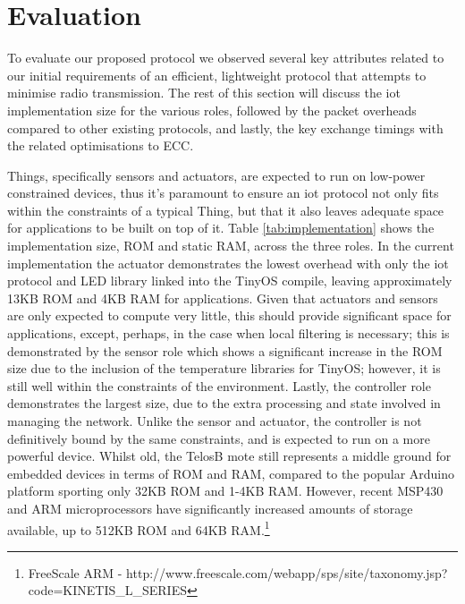 \documentclass[conference]{./sty/IEEEtran}
\begin{document}
\section{Evaluation} %
\label{sec:evaluation}
To evaluate our proposed protocol we observed several key attributes related to our initial requirements of an efficient, lightweight protocol that attempts to minimise radio transmission. The rest of this section will discuss the iot implementation size for the various roles, followed by the packet overheads compared to other existing protocols, and lastly, the key exchange timings with the related optimisations to ECC.

Things, specifically sensors and actuators, are expected to run on low-power constrained devices, thus it's paramount to ensure an iot protocol not only fits within the constraints of a typical Thing, but that it also leaves adequate space for applications to be built on top of it. Table \ref{tab:implementation} shows the implementation size, ROM and static RAM, across the three roles. In the current implementation the actuator demonstrates the lowest overhead with only the iot protocol and LED library linked into the TinyOS compile, leaving approximately 13KB ROM and 4KB RAM for applications. Given that actuators and sensors are only expected to compute very little, this should provide significant space for applications, except, perhaps, in the case when local filtering is necessary; this is demonstrated by the sensor role which shows a significant increase in the ROM size due to the inclusion of the temperature libraries for TinyOS; however, it is still well within the constraints of the environment. Lastly, the controller role demonstrates the largest size, due to the extra processing and state involved in managing the network. Unlike the sensor and actuator, the controller is not definitively bound by the same constraints, and is expected to run on a more powerful device. Whilst old, the TelosB mote still represents a middle ground for embedded devices in terms of ROM and RAM, compared to the popular Arduino platform sporting only 32KB ROM and 1-4KB RAM. However, recent MSP430 and ARM microprocessors have significantly increased amounts of storage available, up to 512KB ROM and 64KB RAM.\footnote{FreeScale ARM - http://www.freescale.com/webapp/sps/site/taxonomy.jsp?code=KINETIS_L_SERIES}
\end{document}
